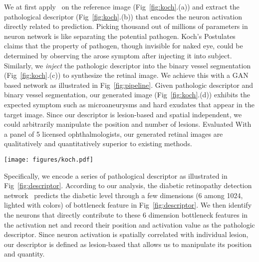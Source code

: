 \documentclass[letterpaper]{article} %
\begin{document}
    We at first apply~\cite{oO2016detector} on the  reference image (Fig~\ref{fig:koch}.(a)) and extract the pathological descriptor (Fig~\ref{fig:koch}.(b)) that encodes the neuron activation directly related to prediction. Picking thousand out of  millions of parameters in neuron network is like separating the potential pathogen. Koch's Postulates claims that the property of pathogen, though invisible for naked eye, could be determined by observing the arose symptom after injecting it into subject.  Similarly, we \emph{inject} the pathologic descriptor into the binary vessel segmentation (Fig~\ref{fig:koch}.(c)) to synthesize the retinal image. We achieve this with a GAN based network as illustrated in Fig~\ref{fig:pipeline}. Given pathologic descriptor and binary vessel segmentation, our generated image (Fig~\ref{fig:koch}.(d))  exhibits the expected symptom such as microaneurysms and hard exudates that appear in the target image. Since our descriptor is lesion-based and spatial independent, we could arbitrarily manipulate the position and number of lesions. Evaluated With a panel of 5  licensed  ophthalmologists, our generated retinal images are  qualitatively and quantitatively superior to existing methods.








	\begin{figure*}[h!]
		\begin{center}
			\texttt{[image: figures/koch.pdf]}
		\end{center}
		\caption{Koch's Postulates are criteria in Evidence Based Medicine (EBM) to determine the pathogen for a certain disease. They state that the pathogen must be found in diseased subjects but not in healthy ones; the pathogen must be isolated and grown in pure culture; the cultured pathogen should cause disease after injected into healthy subject; the pathogen isolated again is the same as the injected one. The methodology of this paper is an analogy to Koch's Postulates. (a) Reference retinal image with disease. (b) Extract pathological descriptor from an image like separating pathogen. (c) Apply the descriptor on a binary vessel segmentation like injecting purified pathogen into the subject. (d) The synthesized image or subject with same symptom.}
		\label{fig:koch}
	\end{figure*}



	Specifically, we  encode a series of pathological descriptor as illustrated in Fig~\ref{fig:descriptor}. According to our analysis, the diabetic retinopathy detection network~\cite{oO2016detector} predicts the diabetic level through a few dimensions (6 among 1024, lighted with colors) of bottleneck feature in Fig~\ref{fig:descriptor}. We then identify the neurons that directly contribute to these 6 dimension bottleneck features in the activation net and record their position and activation value as the pathologic descriptor. Since neuron activation is spatially correlated with individual lesion, our descriptor is defined as lesion-based that allows us to manipulate its position and quantity.
\end{document}
